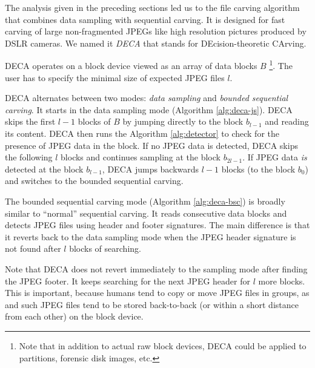 \documentclass[final,5p,times,twocolumn,authoryear]{elsarticle}
\begin{document}
The analysis given in the preceding sections led us to the file carving algorithm that combines data sampling with sequential carving. It is designed for fast carving of large non-fragmented JPEGs like high resolution pictures produced by DSLR cameras. We named it \emph{DECA} that stands for DEcision-theoretic CArving. 

DECA operates on a block device viewed as an array of data blocks $B$ \footnote{Note that in addition to actual raw block devices, DECA could be applied to partitions, forensic disk images, etc.}. The user has to specify the minimal size of expected JPEG files $l$. 

DECA alternates between two modes: \emph{data sampling} and \emph{bounded sequential carving}. It starts in the data sampling mode (Algorithm \ref{alg:deca-js}). DECA skips the first $l-1$ blocks of $B$ by jumping directly to the block $b_{l-1}$ and reading its content. DECA then runs the Algorithm \ref{alg:detector} to check for the presence of JPEG data in the block. If no JPEG data is detected, DECA skips the following $l$ blocks and continues sampling at the block $b_{2l-1}$. If JPEG data \emph{is} detected at the block $b_{l-1}$, DECA jumps backwards $l-1$ blocks (to the block $b_0$) and switches to the bounded sequential carving. 

The bounded sequential carving mode (Algorithm \ref{alg:deca-bsc}) is broadly similar to ``normal'' sequential carving. It reads consecutive data blocks and detects JPEG files using header and footer signatures. The main difference is that it reverts back to the data sampling mode when the JPEG header signature is not found after $l$ blocks of searching.

Note that DECA does not revert immediately to the sampling mode after finding the JPEG footer. It keeps searching for the next JPEG header for $l$ more blocks. This is important, because humans tend to copy or move JPEG files in groups, as and such JPEG files tend to be stored back-to-back (or within a short distance from each other) on the block device. 
\end{document}

